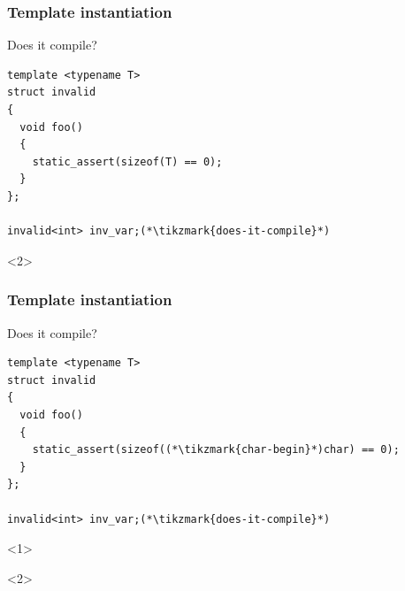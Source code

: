 \documentclass[14pt]{beamer}
\begin{document}
\begin{frame}[fragile]
  \frametitle{Template instantiation}

    Does it compile?

    \vspace{.25cm}

  \begin{lstlisting}[basicstyle=\codefontsize{12pt}]
template <typename T>
struct invalid
{
  void foo()
  {
    static_assert(sizeof(T) == 0);
  }
};

invalid<int> inv_var;(*\tikzmark{does-it-compile}*)
  \end{lstlisting}

  \begin{onlyenv}<2>
    \nointerlineskip
  \end{onlyenv}

\end{frame}

\begin{frame}[fragile]
  \frametitle{Template instantiation}

    Does it compile?

    \vspace{.25cm}

  \begin{lstlisting}[basicstyle=\codefontsize{12pt}]
template <typename T>
struct invalid
{
  void foo()
  {
    static_assert(sizeof((*\tikzmark{char-begin}*)char) == 0);
  }
};

invalid<int> inv_var;(*\tikzmark{does-it-compile}*)
  \end{lstlisting}

  \begin{onlyenv}<1>
    \nointerlineskip
  \end{onlyenv}

  \begin{onlyenv}<2>
    \nointerlineskip
  \end{onlyenv}

\end{frame}
\end{document}
